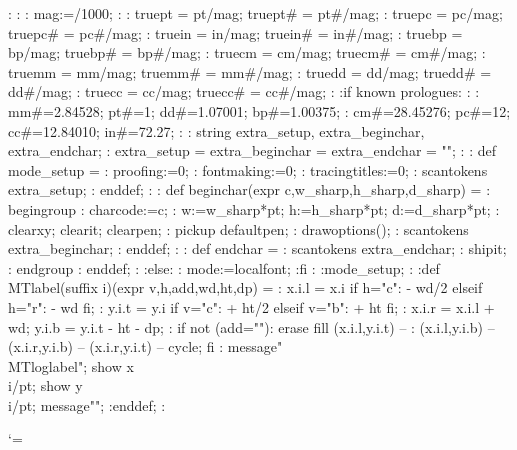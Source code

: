 \MT:%
\MT:
\MT: mag:=\number\mag/1000;
\MT:
\MT: truept = pt/mag; truept# = pt#/mag;
\MT: truepc = pc/mag; truepc# = pc#/mag;
\MT: truein = in/mag; truein# = in#/mag;
\MT: truebp = bp/mag; truebp# = bp#/mag;
\MT: truecm = cm/mag; truecm# = cm#/mag;
\MT: truemm = mm/mag; truemm# = mm#/mag;
\MT: truedd = dd/mag; truedd# = dd#/mag;
\MT: truecc = cc/mag; truecc# = cc#/mag;
\MT:
\MT:if known prologues: %
\MT:
\MT: mm#=2.84528;      pt#=1;        dd#=1.07001;      bp#=1.00375;
\MT: cm#=28.45276;     pc#=12;       cc#=12.84010;     in#=72.27;
\MT:
\MT: string extra_setup, extra_beginchar, extra_endchar;
\MT: extra_setup = extra_beginchar = extra_endchar = "";
\MT:
\MT: def mode_setup =
\MT:  proofing:=0;                   %
\MT:  fontmaking:=0;                 %
\MT:  tracingtitles:=0;              %
\MT:  scantokens extra_setup;
\MT: enddef;
\MT:
\MT: def beginchar(expr c,w_sharp,h_sharp,d_sharp) =
\MT:  begingroup
\MT:   charcode:=c;
\MT:   w:=w_sharp*pt; h:=h_sharp*pt; d:=d_sharp*pt;
\MT:   clearxy; clearit; clearpen;
\MT:   pickup defaultpen;
\MT:   drawoptions();
\MT:   scantokens extra_beginchar;
\MT: enddef;
\MT:
\MT: def endchar =
\MT:   scantokens extra_endchar;
\MT:   shipit;
\MT:  endgroup
\MT: enddef;
\MT:
\MT:else: %
\MT: mode:=localfont;
\MT:fi
\MT:
\MT:mode_setup;
\MT:
\MT:def MTlabel(suffix i)(expr v,h,add,wd,ht,dp) =
\MT: x.i.l = x.i if h="c": - wd/2 elseif h="r": - wd fi;
\MT: y.i.t = y.i if v="c": + ht/2 elseif v="b": + ht fi;
\MT: x.i.r = x.i.l + wd; y.i.b = y.i.t - ht - dp;
\MT: if not (add=""): erase fill (x.i.l,y.i.t) --
\MT:  (x.i.l,y.i.b) -- (x.i.r,y.i.b) -- (x.i.r,y.i.t) -- cycle; fi
\MT: message"\\MTloglabel"; show x\\i/pt; show y\\i/pt; message"";
\MT:enddef;
\MT:

\let\texbye=\bye
\outer{}

\catcode`\@=\MToldatcatcode
